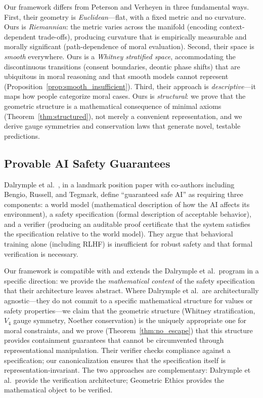 \documentclass[12pt,letterpaper]{article}
\theoremstyle{definition}
\theoremstyle{remark}
\begin{document}
Our framework differs from Peterson and Verheyen in three fundamental ways. First, their geometry is \emph{Euclidean}---flat, with a fixed metric and no curvature. Ours is \emph{Riemannian}: the metric varies across the manifold (encoding context-dependent trade-offs), producing curvature that is empirically measurable and morally significant (path-dependence of moral evaluation). Second, their space is \emph{smooth} everywhere. Ours is a \emph{Whitney stratified space}, accommodating the discontinuous transitions (consent boundaries, deontic phase shifts) that are ubiquitous in moral reasoning and that smooth models cannot represent (Proposition~\ref{prop:smooth_insufficient}). Third, their approach is \emph{descriptive}---it maps how people categorize moral cases. Ours is \emph{structural}: we prove that the geometric structure is a mathematical consequence of minimal axioms (Theorem~\ref{thm:structured}), not merely a convenient representation, and we derive gauge symmetries and conservation laws that generate novel, testable predictions.

\subsection{Provable AI Safety Guarantees}

Dalrymple et al.\ \cite{dalrymple2024}, in a landmark position paper with co-authors including Bengio, Russell, and Tegmark, define ``guaranteed safe AI'' as requiring three components: a world model (mathematical description of how the AI affects its environment), a safety specification (formal description of acceptable behavior), and a verifier (producing an auditable proof certificate that the system satisfies the specification relative to the world model). They argue that behavioral training alone (including RLHF) is insufficient for robust safety and that formal verification is necessary.

Our framework is compatible with and extends the Dalrymple et al.\ program in a specific direction: we provide the \emph{mathematical content} of the safety specification that their architecture leaves abstract. Where Dalrymple et al.\ are architecturally agnostic---they do not commit to a specific mathematical structure for values or safety properties---we claim that the geometric structure (Whitney stratification, $V_4$ gauge symmetry, Noether conservation) is the uniquely appropriate one for moral constraints, and we prove (Theorem~\ref{thm:no_escape}) that this structure provides containment guarantees that cannot be circumvented through representational manipulation. Their verifier checks compliance against a specification; our canonicalization ensures that the specification itself is representation-invariant. The two approaches are complementary: Dalrymple et al.\ provide the verification architecture; Geometric Ethics provides the mathematical object to be verified.
\end{document}
